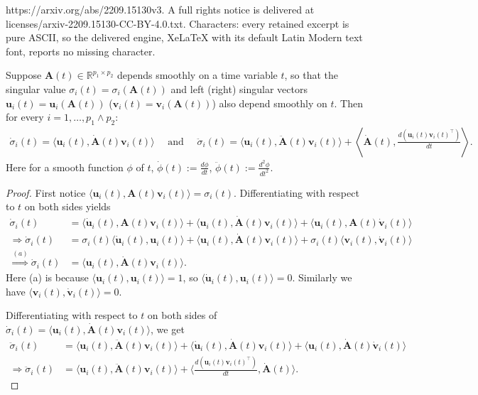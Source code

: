 \documentclass[10pt,a4paper]{amsart}
\newcommand{\A}{{\mathbf{A}}}
\newcommand{\bbR}{\mathbb{R}}
\renewcommand{\u}{{\mathbf{u}}}
\renewcommand{\v}{{\mathbf{v}}}
\begin{document}
https://arxiv.org/abs/2209.15130v3. A full rights notice is delivered at licenses/arxiv-2209.15130-CC-BY-4.0.txt. Characters: every retained excerpt is pure ASCII, so the delivered engine, XeLaTeX with its default Latin Modern text font, reports no missing character.
\begin{Lemma} \label{lm: variation-formula-for-singular-values}
	Suppose $\A(t) \in \bbR^{p_1 \times p_2}$ depends smoothly on a time variable $t$, so that the singular value $\sigma_i(t) = \sigma_i(\A(t))$ and left (right) singular vectors $\u_i(t) = \u_i(\A(t))$ ($\v_i(t) = \v_i(\A(t))$) also depend smoothly on $t$. Then for every $i = 1, \ldots, p_1 \wedge p_2$:
	\begin{equation*}
		\begin{split}
			\dot{\sigma}_i(t) = \langle \u_i(t), \dot{\A}(t) \v_i(t) \rangle \quad \text{ and }\quad 
			\ddot{\sigma}_i(t) =\langle \u_i(t), \ddot{\A}(t) \v_i(t) \rangle + \left\langle \dot{\A}(t), \frac{d (\u_i(t) \v_i(t)^\top)}{dt} \right\rangle.
		\end{split}
	\end{equation*} Here for a smooth function $\phi$ of $t$, $\dot{\phi}(t) := \frac{d\phi }{dt}$, $\ddot{\phi}(t) := \frac{d^2 \phi}{dt^2}$.
\end{Lemma}

\begin{proof}
	First notice $\langle \u_i(t), \A(t) \v_i(t) \rangle = \sigma_i(t)$. Differentiating with respect to $t$ on both sides yields
	\begin{equation}\label{eq: first-order-derive}
	\begin{split}
		 \dot{\sigma}_i(t)&=\langle \dot{\u}_i(t), \A(t) \v_i(t) \rangle + \langle \u_i(t), \dot{\A}(t) \v_i(t) \rangle + \langle \u_i(t), \A(t) \dot{\v}_i(t) \rangle\\
		\Longrightarrow \dot{\sigma}_i(t)&=\sigma_i(t) \langle \dot{\u}_i(t), \u_i(t) \rangle + \langle \u_i(t), \dot{\A}(t) \v_i(t) \rangle + \sigma_i(t)\langle \v_i(t), \dot{\v}_i(t) \rangle\\
		\overset{(a)}\Longrightarrow \dot{\sigma}_i(t) &=  \langle \u_i(t), \dot{\A}(t) \v_i(t) \rangle.
	\end{split}
	\end{equation} Here (a) is because $\langle \u_i(t), \u_i(t) \rangle = 1$, so $\langle \dot{\u}_i(t), \u_i(t) \rangle = 0$. Similarly we have $\langle \v_i(t), \dot{\v}_i(t) \rangle = 0$.
	
	Differentiating with respect to $t$ on both sides of $\dot{\sigma}_i(t) = \langle \u_i(t), \dot{\A}(t) \v_i(t) \rangle$, we get
	\begin{equation*}
		\begin{split}
			\ddot{\sigma}_i(t) &= \langle \u_i(t), \ddot{\A}(t) \v_i(t) \rangle + \langle \dot{\u}_i(t), \dot{\A}(t) \v_i(t) \rangle + \langle \u_i(t), \dot{\A}(t) \dot{\v}_i(t) \rangle \\
			\Longrightarrow  \ddot{\sigma}_i(t) &= \langle \u_i(t), \ddot{\A}(t) \v_i(t) \rangle + \langle \frac{d (\u_i(t) \v_i(t)^\top)}{dt}, \dot{\A}(t) \rangle .
		\end{split}
	\end{equation*}
\end{proof}
\end{document}
